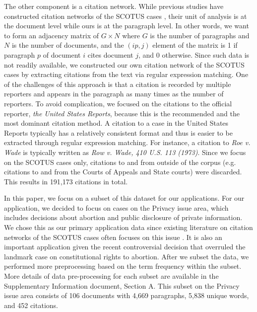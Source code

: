 The other component is a citation network.
While previous studies have constructed citation networks of the SCOTUS cases \citep{fowler2007network, clark2012genealogy}, their unit of analysis is at the document level while ours is at the paragraph level.
In other words, we want to form an adjacency matrix of $G\times N$ where $G$ is the number of paragraphs and $N$ is the number of documents, and the $(ip, j)$ element of the matrix is 1 if paragraph $p$ of document $i$ cites document $j$, and 0 otherwise. 
Since such data is not readily available, we constructed our own citation network of the SCOTUS cases by extracting citations from the text via regular expression matching. 
One of the challenges of this approach is that a citation is recorded by multiple reporters and appears in the paragraph as many times as the number of reporters.
To avoid complication, we focused on the citations to the official reporter, \textit{the United States Reports}, because this is the recommended and the most dominant citation method.
A citation to a case in the United States Reports typically has a relatively consistent format and thus is easier to be extracted through regular expression matching. 
For instance, a citation to \textit{Roe v. Wade} is typically written as \textit{Row v. Wade, 410 U.S. 113 (1973)}. 
Since we focus on the SCOTUS cases only, citations to and from outside of the corpus (e.g. citations to and from the Courts of Appeals and State courts) were discarded. 
This results in 191,173 citations in total.  

In this paper, we focus on a subset of this dataset for our applications. 
For our application, we decided to focus on cases on the Privacy issue area, which includes decisions about abortion and public disclosure of private information.
We chose this as our primary application data since existing literature on citation networks of the SCOTUS cases often focuses on this issue \citep{fowler2007network, clark2012genealogy}.
It is also an important application given the recent controversial decision that overruled the landmark case on constitutional rights to abortion. 
After we subset the data, we performed more preprocessing based on the term frequency within the subset.
More details of data pre-processing for each subset are available in the Supplementary Information document, Section A. 
This subset on the Privacy issue area consists of 106 documents with 4,669 paragraphs, 5,838 unique words, and 452 citations.

